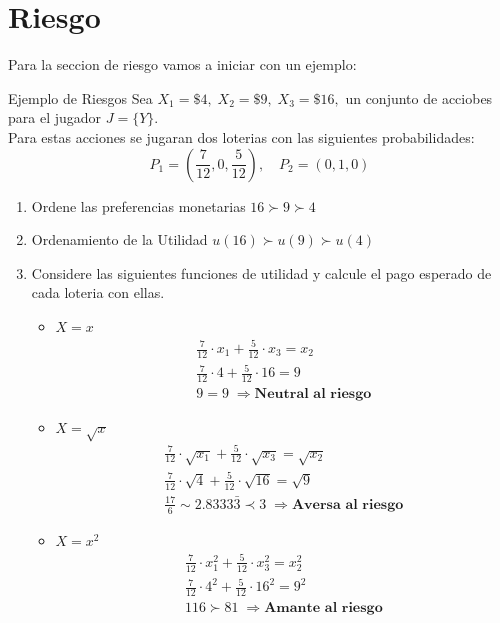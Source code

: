 \documentclass[12pt]{article}
\begin{document}
\section{Riesgo}
Para la seccion de riesgo vamos a iniciar con un ejemplo: 
\begin{ejemplo}{Ejemplo de Riesgos}
    Sea $X_1=\$4,\;X_2=\$9,\; X_3=\$16,$ un conjunto de acciobes para el jugador $J=\{Y\}$. \\
    Para estas acciones se jugaran dos loterias con las siguientes probabilidades: \\
    $$P_1=(\frac{7}{12},0,\frac{5}{12}), \quad P_2=(0,1,0)$$
    \begin{enumerate}
        \item {Ordene las preferencias monetarias}
        $16\succ9\succ4$
        \item {Ordenamiento de la Utilidad}
        $u(16)\succ u(9)\succ u(4)$
        \item Considere las siguientes funciones de utilidad y calcule el pago esperado de cada loteria con ellas. 
        \begin{itemize}
            \item $X=x$
            \begin{align*}
                \frac{7}{12}\cdot x_1 + \frac{5}{12} \cdot x_3 = x_2 \\ 
                \frac{7}{12}\cdot 4 + \frac{5}{12} \cdot 16 = 9 \\
            9=9 \; \Rightarrow\textbf{Neutral al riesgo}
            \end{align*}
            \item $X=\sqrt{x}$
            \begin{align*}
                \frac{7}{12}\cdot \sqrt{x_1} + \frac{5}{12} \cdot \sqrt{x_3} = \sqrt{x_2} \\
                \frac{7}{12}\cdot \sqrt{4} + \frac{5}{12} \cdot \sqrt{16} = \sqrt{9} \\
                \frac{17}{6}\sim2.8333\bar{3} \prec 3 \; \Rightarrow \textbf{Aversa al riesgo}
            \end{align*}
            \item $X=x^2$
            \begin{align*}
                \frac{7}{12}\cdot x_1^2 + \frac{5}{12} \cdot x_3^2 = x_2^2 \\ 
                \frac{7}{12}\cdot 4^2 + \frac{5}{12} \cdot 16^2 = 9^2 \\
                116\succ81\; \Rightarrow \textbf{Amante al riesgo}
            \end{align*}
        \end{itemize}
    \end{enumerate}
\end{ejemplo}
\end{document}
